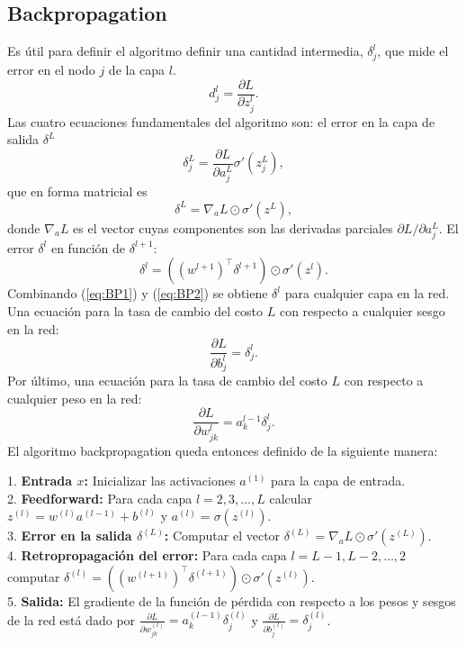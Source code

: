 \documentclass[12pt,a4paper]{article}
\begin{document}
\subsection{Backpropagation}
Es útil para definir el algoritmo definir una cantidad intermedia, $\delta^l_j$, que mide el error en el nodo $j$ de la capa $l$.
$$
d^l_j = \frac{\partial L}{\partial z^l_j}.
$$
Las cuatro ecuaciones fundamentales del algoritmo son: el error en la capa de salida $\delta^L$
$$
\delta^L_j = \frac{\partial L}{\partial a^L_j} \sigma'(z^L_j),
$$
que en forma matricial es
\[
\delta^L = \nabla_a L \odot \sigma'(z^L), \label{eq:BP1}\tag{BP1}
\]
donde $\nabla_a L$ es el vector cuyas componentes son las derivadas parciales $\partial L / \partial a^L_j$.
El error $\delta^l$ en función de $\delta^{l+1}$:
\[
\delta^l = ((w^{l+1})^\top \delta^{l+1}) \odot \sigma'(z^l). \label{eq:BP2}\tag{BP2}
\]
Combinando (\ref{eq:BP1}) y (\ref{eq:BP2}) se obtiene $\delta^l$ para cualquier capa en la red.
Una ecuación para la tasa de cambio del costo $L$ con respecto a cualquier sesgo en la red:
\[
\frac{\partial L}{\partial b^l_j} = \delta^l_j. \label{eq:BP3}\tag{BP3}
\]
Por último, una ecuación para la tasa de cambio del costo $L$ con respecto a cualquier peso en la red:
\[
\frac{\partial L}{\partial w^l_{jk}} = a^{l-1}_k \delta^l_j. \label{eq:BP4}\tag{BP4}
\]
El algoritmo backpropagation queda entonces definido de la siguiente manera:
\begin{algorithm}
    1. {\bf Entrada $x$:} Inicializar las activaciones $a^{(1)}$ para la capa de entrada.\\
    2. {\bf Feedforward:} Para cada capa $l=2,3,\dots,L$ calcular $z^{(l)} = w^{(l)} a^{(l-1)} + b^{(l)}$ y $a^{(l)} = \sigma(z^{(l)})$.\\
    3. {\bf Error en la salida $\delta^{(L)}$:} Computar el vector $\delta^{(L)} = \nabla_a L \odot \sigma'(z^{(L)})$.\\
    4. {\bf Retropropagación del error:} Para cada capa $l=L-1, L-2, \dots, 2$ computar $\delta^{(l)} = ((w^{(l+1)})^\top \delta^{(l+1)}) \odot \sigma'(z^{(l)})$.\\
    5. {\bf Salida:} El gradiente de la función de pérdida con respecto a los pesos y sesgos de la red está dado por $\frac{\partial L}{\partial w^{(l)}_{jk}} = a^{(l-1)}_k \delta^{(l)}_j$ y $\frac{\partial L}{\partial b^{(l)}_j} = \delta^{(l)}_j$.
\end{algorithm}
\end{document}
